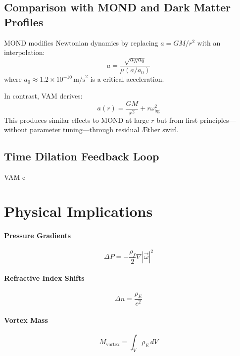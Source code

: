 \documentclass[12pt]{article}
\begin{document}
    \subsection{Comparison with MOND and Dark Matter Profiles}

    MOND modifies Newtonian dynamics by replacing $a = GM/r^2$ with an interpolation:
    \[
        a = \frac{\sqrt{a_N a_0}}{\mu(a/a_0)}
    \]
    where $a_0 \approx 1.2 \times 10^{-10} \, \text{m/s}^2$ is a critical acceleration.

    In contrast, VAM derives:
    \[
        a(r) = \frac{G M}{r^2} + r \omega_{\text{bg}}^2
    \]
    This produces similar effects to MOND at large $r$ but from first principles—without parameter tuning—through residual \AE{}ther swirl.

    \subsection{Time Dilation Feedback Loop}

    VAM c

    \section{Physical Implications}

    \paragraph{Pressure Gradients}
    \[
        \Delta P = -\frac{\rho_{\!f}}{2} \nabla |\vec{\omega}|^2
    \]

    \paragraph{Refractive Index Shifts}
    \[
        \Delta n = \frac{\rho_{\scriptscriptstyle\boldsymbol\!E}}{c^2}
    \]

    \paragraph{Vortex Mass}
    \[
        M_{\text{vortex}} = \int_V \rho_{\scriptscriptstyle\boldsymbol\!E} \, dV
    \]
\end{document}
